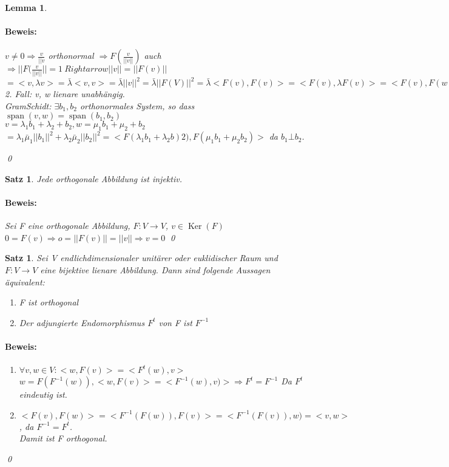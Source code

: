\documentclass{report}
\newcommand{\lb}{\lambda}
\DeclareMathOperator{\Span}{span}
\DeclareMathOperator{\Ker}{Ker}
\theoremstyle{customrem}
\theoremstyle{customdef}
\newtheorem{lemma}[definition]{Lemma}
\newtheorem{satz}[definition]{Satz}
\renewenvironment{proof}{\paragraph{Beweis: }}{\qed}
\theoremstyle{customenv}
\begin{document}
\begin{lemma}
\begin{proof}
\begin{enumerate}
{        \(v \neq 0 \Rightarrow \frac{v}{||v}\) orthonormal \(\Rightarrow F(\frac{v}{||v||})\) auch
        \(\Rightarrow ||F(\frac{v}{||v||}|| = 1 \ Rightarrow ||v|| = ||F(v)||\)\\
        \(<v, w> = <v, \lb v> = \bar\lb <v, v> = \bar\lb ||v||^2 = \bar\lb||F(V)||^2 = \bar\lb <F(v), F(v)> = <F(v), \lb F(v)> = <F(v), F(w)>\)\\
        2. Fall: v, w lienare unabh\"angig.\\
        GramSchidt: \(\exists b_1, b_2\) orthonormales System, so dass \(\Span(v, w) = \Span(b_1, b_2)\)\\
        \(v=  \lb_1 b_1 + \lb_2 + b_2, w = \mu_1 b_1 + \mu_2 + b_2\)\\
        \(<v, w> = \lb_1 \bar\mu_1 ||b_1||^2 + \lb_2 \bar\mu_2 ||b_2||^2 = <F(\lb_1b_1 + \lb_2b)2), F(\mu_1 b_1 + \mu_2 b_2)>\) da \(b_1 \bot b_2\).
      }
    \end{enumerate}
  \end{proof}
\end{lemma}

\begin{satz}
  Jede orthogonale Abbildung ist injektiv.
  \begin{proof}
    Sei F eine orthogonale Abbildung, \(F : V \to V\), \(v \in \Ker(F)\)\\
    \(0 = F(v) \Rightarrow o = ||F(v)|| = ||v|| \Rightarrow v = 0\)
  \end{proof}
\end{satz}

\begin{satz}
  Sei V endlichdimensionaler unit\"arer oder euklidischer Raum und
  \(F : V \to V\) eine bijektive lienare Abbildung. Dann sind folgende
  Aussagen \"aquivalent:
  \begin{enumerate}
    \item{F ist orthogonal}
    \item{Der adjungierte Endomorphismus \(F^t\) von F ist \(F^{-1}\)}
  \end{enumerate}
  \begin{proof}
    \begin{enumerate}
      \item[\(1.) \Rightarrow 2.)\)] {
        \(\forall v, w \in V : <w, F(v)> = <F^t(w), v>\)\\
        \(w = F(F^{-1}(w)), <w, F(v)> = <F^{-1}(w), v)>
        \Rightarrow F^t = F^{-1}\) Da \(F^t\) eindeutig ist.
      }
      \item[\(2.) \Rightarrow 1.)\)] {
          \(<F(v), F(w)> = <F^{-1}(F(w)), F(v)> = <F^{-1}(F(v)), w) = <v, w>\),
          da \(F^{-1} = F^t\).\\
          Damit ist F orthogonal.
      }
    \end{enumerate}
  \end{proof}
\end{satz}
\end{document}
